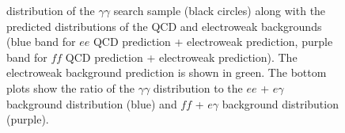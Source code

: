 \documentclass[dissertation.tex]{subfiles}
\begin{document}
\begin{figure}
	\caption{\MET distribution of the $\gamma\gamma$ search sample (black circles) along with the predicted \MET distributions of the QCD and electroweak backgrounds (blue band for $ee$ QCD prediction + electroweak prediction, purple band for $\mathit{ff}$ QCD prediction + electroweak prediction).  The electroweak background prediction is shown in green.  The bottom plots show the ratio of the $\gamma\gamma$ \MET distribution to the $ee$ + $e\gamma$ background distribution (blue) and $\mathit{ff}$ + $e\gamma$ background distribution (purple).}
	\label{fig:MET_final}
\end{figure}
\end{document}
